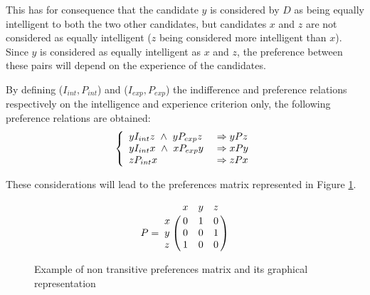 This has for consequence that the candidate $y$ is considered by $D$ as being equally intelligent to both the two other candidates, but candidates $x$ and $z$ are not considered as equally intelligent ($z$ being considered more intelligent than $x$).
Since $y$ is considered as equally intelligent as $x$ and $z$, the preference between these pairs will depend on the experience of the candidates.

By defining ($I_{int}, P_{int}$) and ($I_{exp}, P_{exp}$) the indifference and preference relations respectively on the intelligence and experience criterion only, the following preference relations are obtained:
\begin{equation}
    \begin{split}
     \left \{
        \begin{array}{l l}
            yI_{int}z \ \land \ yP_{exp}z \ & \Rightarrow yPz \\
            yI_{int}x \ \land \ xP_{exp}y \ & \Rightarrow xPy \\
            zP_{int}x                 & \Rightarrow zPx
        \end{array} \right . \\
    \end{split}
    \label{eqn:candidates_nontransitive_dominance_rel}
\end{equation}

These considerations will lead to the preferences matrix represented in Figure \ref{fig:untransitive_matrix}.

\begin{figure}[h]
\begin{minipage}{.5\textwidth}
    \begin{equation*}
        P   = \bordermatrix{~ & x    & y    & z   \cr
                            x & 0    & 1    & 0   \cr
                            y & 0    & 0    & 1   \cr
                            z & 1    & 0    & 0   \cr}
        \label{eq:transitive_pref_example}
    \end{equation*}
\end{minipage}
\begin{minipage}{.5\textwidth}
    \begin{center}
   \end{center}
\end{minipage}%
\caption{Example of non transitive preferences matrix and its graphical representation} \label{fig:untransitive_matrix}
\end{figure}


